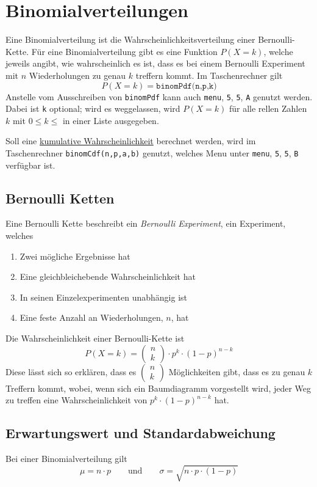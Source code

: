 \documentclass{article}
\begin{document}
\section{Binomialverteilungen}
Eine Binomialverteilung ist die Wahrscheinlichkeitsverteilung einer Bernoulli-Kette. Für eine Binomialverteilung gibt es eine Funktion $P(X=k)$, welche jeweils angibt, wie wahrscheinlich es ist, dass es bei einem Bernoulli Experiment mit $n$ Wiederholungen zu genau $k$ treffern kommt. Im Taschenrechner gilt 
\[
 P(X=k)=\texttt{binomPdf(n,p,k)}
\]
Anstelle vom Ausschreiben von \texttt{binomPdf} kann auch \texttt{menu}, \texttt{5}, \texttt{5}, \texttt{A} genutzt werden. Dabei ist \texttt{k} optional; wird es weggelassen, wird $P(X=k)$ für alle rellen Zahlen $k$ mit $0 \leq k \leq$ in einer Liste ausgegeben.
 
Soll eine \hyperref[Kumulative Wahrscheinlichkeiten]{kumulative Wahrscheinlichkeit} berechnet werden, wird im Taschenrechner \texttt{binomCdf(n,p,a,b)} genutzt, welches Menu unter \texttt{menu}, \texttt{5}, \texttt{5}, \texttt{B} verfügbar ist.
 
\subsection{Bernoulli Ketten}
Eine Bernoulli Kette beschreibt ein \emph{Bernoulli Experiment}, ein Experiment, welches
\begin{enumerate}
 \item Zwei mögliche Ergebnisse hat
 \item Eine gleichbleichebende Wahrscheinlichkeit hat
 \item In seinen Einzelexperimenten unabhängig ist
 \item Eine feste Anzahl an Wiederholungen, $n$, hat 
\end{enumerate} 
Die Wahrscheinlichkeit einer Bernoulli-Kette ist
\[
 P(X=k) =
 \begin{pmatrix} n \\ k \end{pmatrix} \cdot
 p^k \cdot (1-p)^{n-k}
\]
Diese lässt sich so erklären, dass es $\begin{pmatrix} n \\ k \end{pmatrix}$ Möglichkeiten gibt, dass es zu genau $k$ Treffern kommt, wobei, wenn sich ein Baumdiagramm vorgestellt wird, jeder Weg zu treffen eine Wahrscheinlichkeit von $p^k \cdot (1-p)^{n-k}$ hat.
 
\subsection{Erwartungswert und Standardabweichung}
Bei einer Binomialverteilung gilt
\[
 \mu = n \cdot p 
 \qquad \text{und} \qquad
 \sigma = \sqrt{n \cdot p \cdot (1-p)} 
\]
\end{document}

